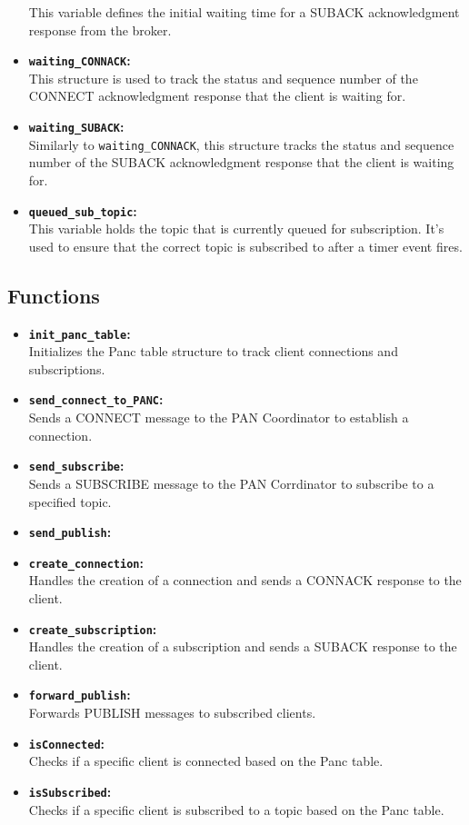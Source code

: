 \documentclass[11pt]{article}
\begin{document}
\begin{itemize}
This variable defines the initial waiting time for a SUBACK acknowledgment response from the broker.
\item{\textbf{\texttt{waiting\_CONNACK}:}}\\
This structure is used to track the status and sequence number of the CONNECT acknowledgment response that the client is waiting for.
\item{\textbf{\texttt{waiting\_SUBACK}:}}\\
Similarly to \texttt{waiting\_CONNACK}, this structure tracks the status and sequence number of the SUBACK acknowledgment response that the client is waiting for.
\item{\textbf{\texttt{queued\_sub\_topic}:}}\\
This variable holds the topic that is currently queued for subscription. It's used to ensure that the correct topic is subscribed to after a timer event fires.

\end{itemize}

\subsection*{Functions}
\begin{itemize}
\item{\textbf{\texttt{init\_panc\_table}:}}\\
Initializes the Panc table structure to track client connections and subscriptions.
\item{\textbf{\texttt{send\_connect\_to\_PANC}:}}\\
Sends a CONNECT message to the PAN Coordinator to establish a connection.
\item{\textbf{\texttt{send\_subscribe}:}}\\
Sends a SUBSCRIBE message to the PAN Corrdinator to subscribe to a specified topic.
\item{\textbf{\texttt{send\_publish}:}}
\item{\textbf{\texttt{create\_connection}:}}\\
Handles the creation of a connection and sends a CONNACK response to the client.
\item{\textbf{\texttt{create\_subscription}:}}\\
Handles the creation of a subscription and sends a SUBACK response to the client.
\item{\textbf{\texttt{forward\_publish}:}}\\
Forwards PUBLISH messages to subscribed clients.
\item{\textbf{\texttt{isConnected}:}}\\
Checks if a specific client is connected based on the Panc table.
\item{\textbf{\texttt{isSubscribed}:}}\\
Checks if a specific client is subscribed to a topic based on the Panc table.
\end{itemize}
\end{document}
